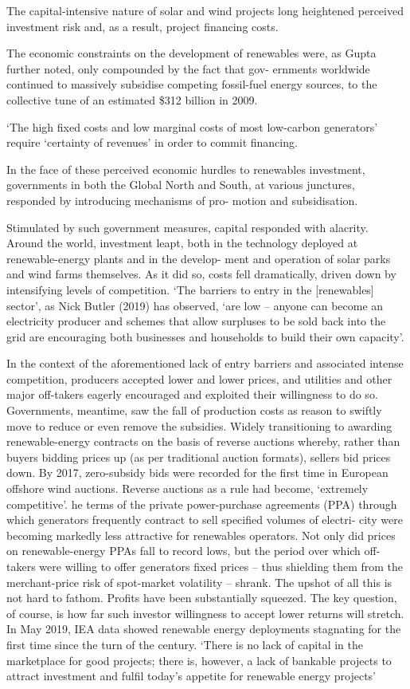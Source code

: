 \documentclass[
]{book}
\begin{document}
The capital-intensive nature of solar and wind projects long heightened perceived investment risk and, as a result, project ﬁnancing costs.

The economic constraints on the
development of renewables were, as Gupta further noted, only compounded by the fact that gov-
ernments worldwide continued to massively subsidise competing fossil-fuel energy sources, to the
collective tune of an estimated \$312 billion in 2009.

`The high ﬁxed costs and low marginal costs of most low-carbon generators'
require `certainty of revenues' in order to commit ﬁnancing.

In the face of these perceived economic hurdles to renewables investment, governments in both
the Global North and South, at various junctures, responded by introducing mechanisms of pro-
motion and subsidisation.

Stimulated by such government measures, capital responded with alacrity. Around the world,
investment leapt, both in the technology deployed at renewable-energy plants and in the develop-
ment and operation of solar parks and wind farms themselves. As it did so, costs fell dramatically,
driven down by intensifying levels of competition. `The barriers to entry in the {[}renewables{]}
sector', as Nick Butler (2019) has observed, `are low -- anyone can become an electricity producer
and schemes that allow surpluses to be sold back into the grid are encouraging both businesses
and households to build their own capacity'.

In the
context of the aforementioned lack of entry barriers and associated intense competition, producers
accepted lower and lower prices, and utilities and other major oﬀ-takers eagerly encouraged and
exploited their willingness to do so. Governments, meantime, saw the fall of production costs as
reason to swiftly move to reduce or even remove the subsidies.
Widely transitioning to awarding renewable-energy contracts on the basis of reverse auctions
whereby, rather than buyers bidding prices up (as per traditional auction formats), sellers bid
prices down.
By 2017, zero-subsidy bids were recorded for the ﬁrst time in European oﬀshore wind auctions.
Reverse auctions as a rule had become, `extremely competitive'.
he terms of the private power-purchase
agreements (PPA) through which generators frequently contract to sell speciﬁed volumes of electri-
city were becoming markedly less attractive for renewables operators. Not only did prices on renewable-energy PPAs fall to record lows, but the period over which oﬀ-takers were willing to oﬀer
generators ﬁxed prices -- thus shielding them from the merchant-price risk of spot-market volatility -- shrank.
The upshot of all this is not hard to fathom. Proﬁts have been substantially squeezed.
The key question, of course, is how far such investor willingness to accept lower returns will
stretch.
In May 2019, IEA data showed renewable energy deployments stagnating for the ﬁrst time
since the turn of the century.
`There is no lack of capital in the
marketplace for good projects; there is, however, a lack of bankable projects to attract investment
and fulﬁl today's appetite for renewable energy projects'
\end{document}
